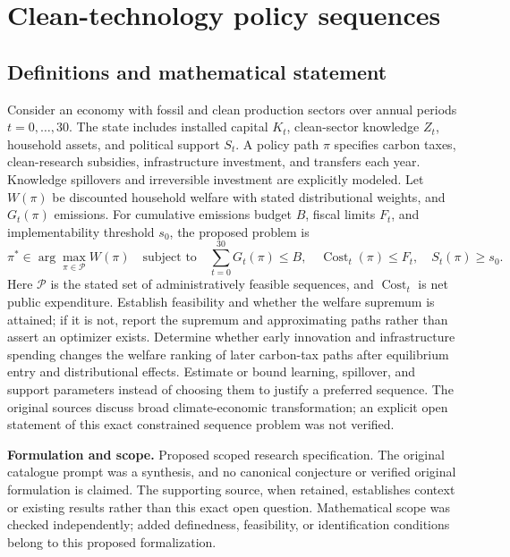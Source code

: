 \documentclass[11pt]{article}
\begin{document}
\section*{Clean-technology policy sequences}\label{30007721}
\subsection{Definitions and mathematical statement}
Consider an economy with fossil and clean production sectors over annual periods \(t=0,\ldots,30\). The state includes installed capital \(K_t\), clean-sector knowledge \(Z_t\), household assets, and political support \(S_t\). A policy path \(\pi\) specifies carbon taxes, clean-research subsidies, infrastructure investment, and transfers each year. Knowledge spillovers and irreversible investment are explicitly modeled. Let \(W(\pi)\) be discounted household welfare with stated distributional weights, and \(G_t(\pi)\) emissions. For cumulative emissions budget \(B\), fiscal limits \(F_t\), and implementability threshold \(s_0\), the proposed problem is
\[\pi^*\in\arg\max_{\pi\in\mathcal P}W(\pi)\quad\text{subject to}\quad\sum_{t=0}^{30}G_t(\pi)\leq B,\quad\operatorname{Cost}_t(\pi)\leq F_t,\quad S_t(\pi)\geq s_0.\]
Here \(\mathcal P\) is the stated set of administratively feasible sequences, and \(\operatorname{Cost}_t\) is net public expenditure. Establish feasibility and whether the welfare supremum is attained; if it is not, report the supremum and approximating paths rather than assert an optimizer exists. Determine whether early innovation and infrastructure spending changes the welfare ranking of later carbon-tax paths after equilibrium entry and distributional effects. Estimate or bound learning, spillover, and support parameters instead of choosing them to justify a preferred sequence. The original sources discuss broad climate-economic transformation; an explicit open statement of this exact constrained sequence problem was not verified.

\par\textbf{Formulation and scope.} Proposed scoped research specification. The original catalogue prompt was a synthesis, and no canonical conjecture or verified original formulation is claimed. The supporting source, when retained, establishes context or existing results rather than this exact open question. Mathematical scope was checked independently; added definedness, feasibility, or identification conditions belong to this proposed formalization.
\end{document}
